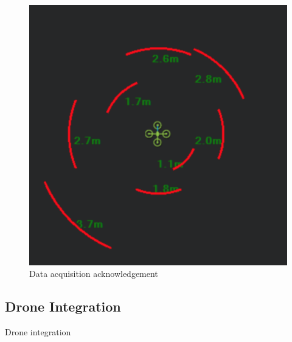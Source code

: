 \begin{figure}[H]
    \centering
    \includegraphics[width=0.3\linewidth]{./projects/logviewer/mission_planner_tower_evo.png}
    \caption{Data acquisition acknowledgement}
\end{figure}

\subsection{Drone Integration}
Drone integration
